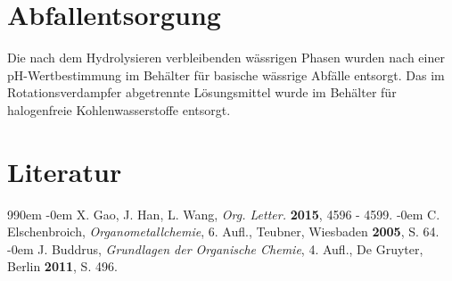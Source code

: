 \documentclass[12pt]{article}
\begin{document}
\begin{onehalfspace}
\section{Abfallentsorgung}
Die nach dem Hydrolysieren verbleibenden wässrigen Phasen wurden
nach einer pH-Wertbestimmung im Behälter für basische wässrige Abfälle entsorgt.
Das im Rotationsverdampfer abgetrennte Lösungsmittel wurde im Behälter für halogenfreie Kohlenwasserstoffe entsorgt.
\section{Literatur}

\renewcommand{\section}[2]{}%
\def\bibindent{0em}
\begin{thebibliography}{99\kern\bibindent}
\makeatletter
\let\old@biblabel\@biblabel
\def\@biblabel#1{\old@biblabel{#1}\kern\bibindent}
\let\old@bibitem\bibitem
\def\bibitem#1{\old@bibitem{#1}\leavevmode\kern-\bibindent}
\makeatother
{}
X. Gao, J. Han, L. Wang, \textit{Org. Letter.} \textbf{2015}, 4596 - 4599.
C. Elschenbroich, \textit{Organometallchemie}, 6. Aufl., Teubner, Wiesbaden \textbf{2005}, S. 64.
J. Buddrus, \textit{Grundlagen der Organische Chemie}, 4. Aufl., De Gruyter, Berlin \textbf{2011}, S. 496.
\end{thebibliography}
\end{onehalfspace}
\end{document}
